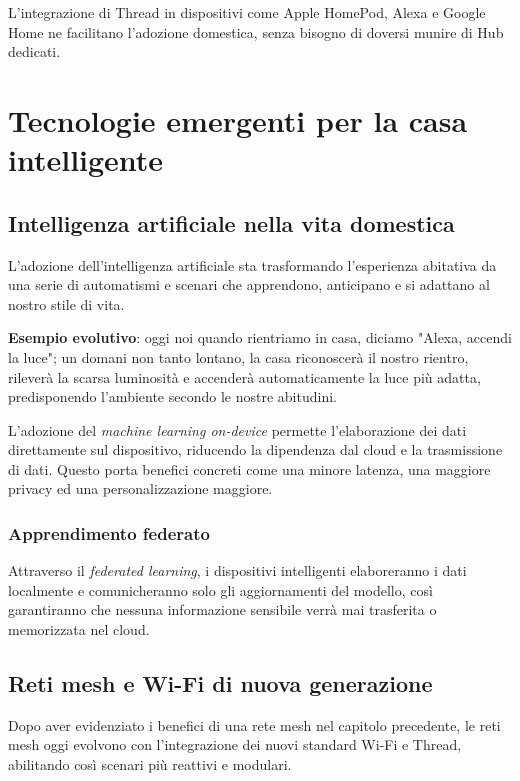 L’integrazione di Thread in dispositivi come Apple HomePod, Alexa e Google Home ne facilitano l’adozione domestica, senza bisogno di doversi munire di Hub dedicati.

\section{Tecnologie emergenti per la casa intelligente}

\subsection{Intelligenza artificiale nella vita domestica}

L'adozione dell’intelligenza artificiale sta trasformando l’esperienza abitativa da una serie di automatismi e scenari che apprendono, anticipano e si adattano al nostro stile di vita.

\textbf{Esempio evolutivo}: oggi noi quando rientriamo in casa, diciamo "Alexa, accendi la luce"; un domani non tanto lontano, la casa riconoscerà il nostro rientro, rileverà la scarsa luminosità e accenderà automaticamente la luce più adatta, predisponendo l’ambiente secondo le nostre abitudini.

L’adozione del \textit{machine learning on-device} permette l’elaborazione dei dati direttamente sul dispositivo, riducendo la dipendenza dal cloud e la trasmissione di dati. Questo porta benefici concreti come una minore latenza, una maggiore privacy ed una personalizzazione maggiore.

\subsubsection{Apprendimento federato}

Attraverso il \textit{federated learning}, i dispositivi intelligenti elaboreranno i dati localmente e comunicheranno solo gli aggiornamenti del modello, così garantiranno che nessuna informazione sensibile verrà mai trasferita o memorizzata nel cloud.

\subsection{Reti mesh e Wi-Fi di nuova generazione}

Dopo aver evidenziato i benefici di una rete mesh nel capitolo precedente, le reti mesh oggi evolvono con l’integrazione dei nuovi standard Wi-Fi e Thread, abilitando così scenari più reattivi e modulari.


